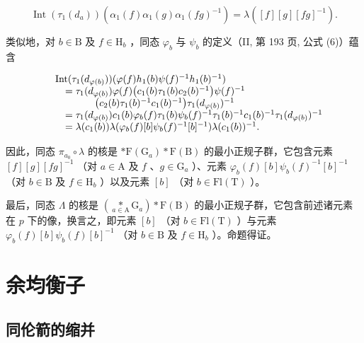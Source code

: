 \[
\operatorname{Int} \left(\tau_ {1} \left(d _ {a}\right)\right) \left(\alpha_ {1} (f) \alpha_ {1} (g) \alpha_ {1} (f g) ^ {- 1}\right) = \lambda ([ f ] [ g ] [ f g ] ^ {- 1}).
\]

类似地，对 \(b \in \mathrm{B}\) 及 \(f \in \mathrm{H}_b\) ，同态 \(\varphi_b\) 与 \(\psi_b\) 的定义（II, 第 193 页, 公式 (6)）蕴含

\[
\begin{array}{r l} & {\mathrm{Int} (\tau_ {1} (d _ {\varphi (b)})) (\varphi (f) h _ {1} (b) \psi (f) ^ {- 1} h _ {1} (b) ^ {- 1})} \\ & {\quad = \tau_ {1} (d _ {\varphi (b)}) \varphi (f) \big (c _ {1} (b) \tau_ {1} (b) c _ {2} (b) ^ {- 1} \big) \psi (f) ^ {- 1}} \\ & {\qquad \qquad \big (c _ {2} (b) \tau_ {1} (b) ^ {- 1} c _ {1} (b) ^ {- 1} \big) \tau_ {1} (d _ {\varphi (b)}) ^ {- 1}} \\ & {\quad = \tau_ {1} (d _ {\varphi (b)}) c _ {1} (b) \varphi_ {b} (f) \tau_ {1} (b) \psi_ {b} (f) ^ {- 1} \tau_ {1} (b) ^ {- 1} c _ {1} (b) ^ {- 1} \tau_ {1} (d _ {\varphi (b)}) ^ {- 1}} \\ & {\quad = \lambda (c _ {1} (b)) \lambda (\varphi_ {b} (f) [ b ] \psi_ {b} (f) ^ {- 1} [ b ] ^ {- 1}) \lambda (c _ {1} (b)) ^ {- 1}.} \end{array}
\]

因此，同态 \(\pi_{a_0} \circ \lambda\) 的核是 \(*\mathrm{F}(\mathrm{G}_a) * \mathrm{F}(\mathrm{B})\) 的最小正规子群，它包含元素 \([f][g][fg]^{-1}\) （对 \(a \in \mathrm{A}\) 及 \(f\) 、\(g \in \mathrm{G}_a\) ）、元素 \(\varphi_b(f)[b]\psi_b(f)^{-1}[b]^{-1}\) （对 \(b \in \mathrm{B}\) 及 \(f \in \mathrm{H}_b\) ）以及元素 \([b]\) （对 \(b \in \mathrm{Fl}(\mathrm{T})\) ）。

最后，同态 \(\Lambda\) 的核是 \((\underset{a\in\mathrm{A}}{*}\mathrm{G}_{a})*\mathrm{F}(\mathrm{B})\) 的最小正规子群，它包含前述诸元素在 \(p\) 下的像，换言之，即元素 \([b]\) （对 \(b\in\mathrm{Fl}(\mathrm{T})\) ）与元素 \(\varphi_{b}(f)[b]\psi_{b}(f)[b]^{-1}\) （对 \(b\in\mathrm{B}\) 及 \(f\in\mathrm{H}_{b}\) ）。命题得证。

\section{余均衡子}

\subsection{同伦箭的缩并}

